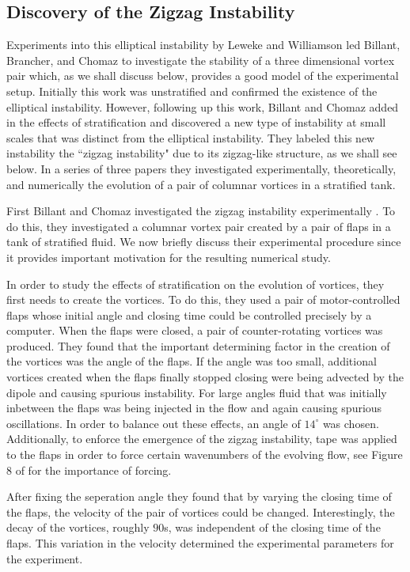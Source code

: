 \subsection{Discovery of the Zigzag Instability}
Experiments into this elliptical instability by Leweke and Williamson \cite{leweke1998} led Billant, Brancher, and Chomaz \cite{bc1999} to investigate the stability of a three dimensional vortex pair which, as we shall discuss below, provides a good model of the experimental setup. Initially this work was unstratified and confirmed the existence of the elliptical instability. However, following up this work, Billant and Chomaz added in the effects of stratification and discovered a new type of instability at small scales that was distinct from the elliptical instability. They labeled this new instability the ``zigzag instability" due to its zigzag-like structure, as we shall see below. In a series of three papers they investigated experimentally\cite{bc2000a}, theoretically\cite{bc2000b}, and numerically \cite{bc2000c} the evolution of a pair of columnar vortices in a stratified tank.

First Billant and Chomaz investigated the zigzag instability experimentally \cite{bc2000a}. To do this, they investigated a columnar vortex pair created by a pair of flaps in a tank of stratified fluid. We now briefly discuss their experimental procedure since it provides important motivation for the resulting numerical study. 

In order to study the effects of stratification on the evolution of vortices, they first needs to create the vortices. To do this, they used a pair of motor-controlled flaps whose initial angle and closing time could be controlled precisely by a computer. When the flaps were closed, a pair of counter-rotating vortices was produced. They found that the important determining factor in the creation of the vortices was the angle of the flaps. If the angle was too small, additional vortices created when the flaps finally stopped closing were being advected by the dipole and causing spurious instability. For large angles fluid that was initially inbetween the flaps was being injected in the flow and again causing spurious oscillations. In order to balance out these effects, an angle of $14^{\circ}$ was chosen. Additionally, to enforce the emergence of the zigzag instability, tape was applied to the flaps in order to force certain wavenumbers of the evolving flow, see Figure 8 of \cite{bc2000a} for the importance of forcing. 

After fixing the seperation angle they found that by varying the closing time of the flaps, the velocity of the pair of vortices could be changed. Interestingly, the decay of the vortices, roughly $90$s, was independent of the closing time of the flaps. This variation in the velocity determined the experimental parameters for the experiment. 

